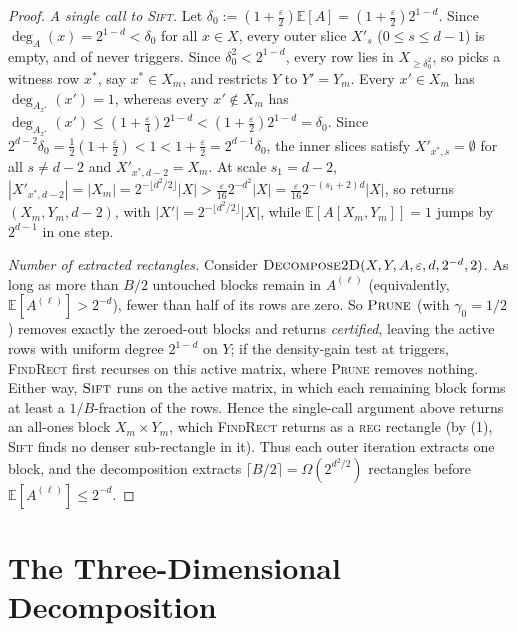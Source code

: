 \documentclass[11pt]{article}
\theoremstyle{definition}
\renewcommand{\label}[1]{}%
\newcommand{\E}{\mathbb{E}}
\newcommand{\abs}[1]{\left\lvert #1 \right\rvert}
\newcommand{\dens}[1]{\E[#1]}
\newcommand{\Prune}{\textnormal{\textsc{Prune}}}
\newcommand{\Sift}{\textnormal{\textsc{Sift}}}
\newcommand{\FindRect}{\textnormal{\textsc{FindRect}}}
\newcommand{\DecomposeTwoD}{\textnormal{\textsc{Decompose2D}}}
\newcommand{\tagreg}{\textnormal{\textsc{reg}}}
\begin{document}
\begin{proof}
\emph{A single call to \Sift{}.} Let $\delta_0 := (1 + \frac{\varepsilon}{2})\dens{A} = (1 + \frac{\varepsilon}{2})2^{1-d}$. Since $\deg_A(x) = 2^{1-d} < \delta_0$ for all $x \in X$, every outer slice $X'_s$ ($0 \le s \le d-1$) is empty, and  of  never triggers. Since $\delta_0^2 < 2^{1-d}$, every row lies in $X_{\ge \delta_0^2}$, so  picks a witness row $x^*$, say $x^* \in X_m$, and restricts $Y$ to $Y' = Y_m$. Every $x' \in X_m$ has $\deg_{A_{x^*}}(x') = 1$, whereas every $x' \notin X_m$ has $\deg_{A_{x^*}}(x') \le (1 + \frac{\varepsilon}{4})2^{1-d} < (1 + \frac{\varepsilon}{2})2^{1-d} = \delta_0$. Since $2^{d-2}\delta_0 = \frac{1}{2}(1 + \frac{\varepsilon}{2}) < 1 < 1 + \frac{\varepsilon}{2} = 2^{d-1}\delta_0$, the inner slices satisfy $X'_{x^*, s} = \emptyset$ for all $s \ne d-2$ and $X'_{x^*, d-2} = X_m$. At scale $s_1 = d-2$, $\abs{X'_{x^*, d-2}} = \abs{X_m} = 2^{-\lfloor d^2/2 \rfloor}\abs{X} > \frac{\varepsilon}{16} 2^{-d^2}\abs{X} = \frac{\varepsilon}{16} 2^{-(s_1+2)d}\abs{X}$, so  returns $(X_m, Y_m, d-2)$, with $\abs{X'} = 2^{-\lfloor d^2/2 \rfloor}\abs{X}$, while $\dens{A[X_m, Y_m]} = 1$ jumps by $2^{d-1}$ in one step.

\emph{Number of extracted rectangles.} Consider $\DecomposeTwoD(X, Y, A, \varepsilon, d, 2^{-d}, 2)$. As long as more than $B/2$ untouched blocks remain in $A^{(\ell)}$ (equivalently, $\dens{A^{(\ell)}} > 2^{-d}$), fewer than half of its rows are zero. So $\Prune$ (with $\gamma_0 = 1/2$) removes exactly the zeroed-out blocks and returns \emph{certified}, leaving the active rows with uniform degree $2^{1-d}$ on $Y$; if the density-gain test at  triggers, \FindRect{} first recurses on this active matrix, where \Prune{} removes nothing. Either way, $\Sift$ runs on the active matrix, in which each remaining block forms at least a $1/B$-fraction of the rows. Hence the single-call argument above returns an all-ones block $X_m \times Y_m$, which \FindRect{} returns as a \tagreg{} rectangle (by (1), \Sift{} finds no denser sub-rectangle in it). Thus each outer iteration extracts one block, and the decomposition extracts $\lceil B/2 \rceil = \Omega(2^{d^2/2})$ rectangles before $\dens{A^{(\ell)}} \le 2^{-d}$.
\end{proof}

\section{The Three-Dimensional Decomposition}
\label{sec:3d}
\end{document}
